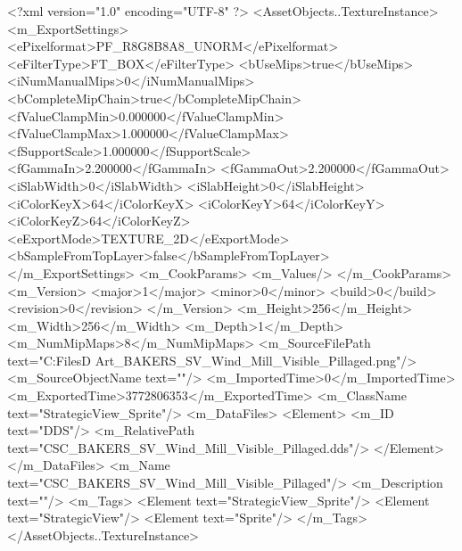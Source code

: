<?xml version="1.0" encoding="UTF-8" ?>
<AssetObjects..TextureInstance>
	<m_ExportSettings>
		<ePixelformat>PF_R8G8B8A8_UNORM</ePixelformat>
		<eFilterType>FT_BOX</eFilterType>
		<bUseMips>true</bUseMips>
		<iNumManualMips>0</iNumManualMips>
		<bCompleteMipChain>true</bCompleteMipChain>
		<fValueClampMin>0.000000</fValueClampMin>
		<fValueClampMax>1.000000</fValueClampMax>
		<fSupportScale>1.000000</fSupportScale>
		<fGammaIn>2.200000</fGammaIn>
		<fGammaOut>2.200000</fGammaOut>
		<iSlabWidth>0</iSlabWidth>
		<iSlabHeight>0</iSlabHeight>
		<iColorKeyX>64</iColorKeyX>
		<iColorKeyY>64</iColorKeyY>
		<iColorKeyZ>64</iColorKeyZ>
		<eExportMode>TEXTURE_2D</eExportMode>
		<bSampleFromTopLayer>false</bSampleFromTopLayer>
	</m_ExportSettings>
	<m_CookParams>
		<m_Values/>
	</m_CookParams>
	<m_Version>
		<major>1</major>
		<minor>0</minor>
		<build>0</build>
		<revision>0</revision>
	</m_Version>
	<m_Height>256</m_Height>
	<m_Width>256</m_Width>
	<m_Depth>1</m_Depth>
	<m_NumMipMaps>8</m_NumMipMaps>
	<m_SourceFilePath text="C:\Users\Shadow\Desktop\Working Files\2D Art\Quarters\Bakers\StrategicView\CSC_BAKERS_SV_Wind_Mill_Visible_Pillaged.png"/>
	<m_SourceObjectName text=""/>
	<m_ImportedTime>0</m_ImportedTime>
	<m_ExportedTime>3772806353</m_ExportedTime>
	<m_ClassName text="StrategicView_Sprite"/>
	<m_DataFiles>
		<Element>
			<m_ID text="DDS"/>
			<m_RelativePath text="CSC_BAKERS_SV_Wind_Mill_Visible_Pillaged.dds"/>
		</Element>
	</m_DataFiles>
	<m_Name text="CSC_BAKERS_SV_Wind_Mill_Visible_Pillaged"/>
	<m_Description text=""/>
	<m_Tags>
		<Element text="StrategicView_Sprite"/>
		<Element text="StrategicView"/>
		<Element text="Sprite"/>
	</m_Tags>
</AssetObjects..TextureInstance>

